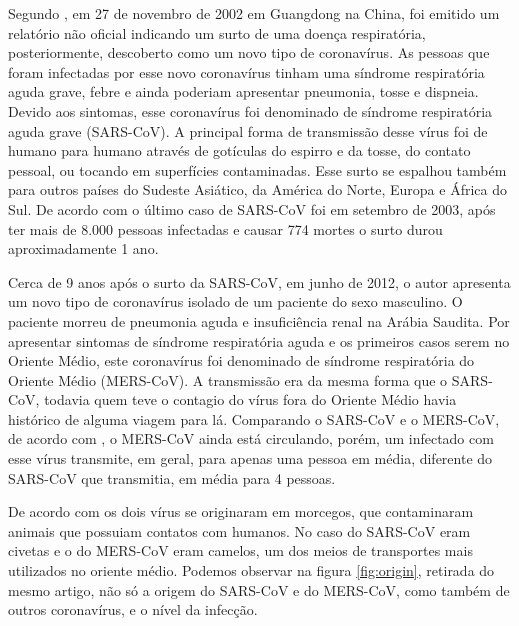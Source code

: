 \documentclass[
  fleqn,ebook]{ic}
\begin{document}
Segundo \cite{al2014travel}, em 27 de novembro de 2002 em Guangdong na
China, foi emitido um relatório não oficial indicando um surto de uma doença
respiratória, posteriormente, descoberto como um novo tipo de coronavírus.
As pessoas que foram infectadas por esse novo coronavírus tinham uma síndrome
respiratória aguda grave, febre e ainda poderiam apresentar pneumonia, tosse e
dispneia. Devido aos sintomas, esse coronavírus foi denominado de síndrome
respiratória aguda grave (SARS-CoV). A principal forma de transmissão desse
vírus foi de humano para humano através de gotículas do espirro e da tosse, do
contato pessoal, ou tocando em superfícies contaminadas. Esse surto se espalhou
também para outros países do Sudeste Asiático, da América do Norte, Europa e
África do Sul. De acordo com \citep{guarner2020three} o último caso de SARS-CoV foi
em setembro de 2003, após ter mais de 8.000 pessoas infectadas e causar 774
mortes o surto durou aproximadamente 1 ano.

Cerca de 9 anos após o surto da SARS-CoV, em junho de 2012, o autor
\cite{@song2019sars} apresenta um novo tipo de coronavírus isolado de um
paciente do sexo masculino. O paciente morreu de pneumonia aguda e insuficiência
renal na Arábia Saudita. Por apresentar sintomas de síndrome respiratória aguda
e os primeiros casos serem no Oriente Médio, este coronavírus foi denominado de
síndrome respiratória do Oriente Médio (MERS-CoV). A transmissão era da mesma
forma que o SARS-CoV, todavia quem teve o contagio do vírus fora do
Oriente Médio havia histórico de alguma viagem para lá. Comparando o SARS-CoV e
o MERS-CoV, de acordo com \cite{guarner2020three}, o MERS-CoV ainda está
circulando, porém, um infectado com esse vírus transmite, em geral, para apenas
uma pessoa em média, diferente do SARS-CoV que transmitia, em média para 4
pessoas.

De acordo com \cite{cui2019origin} os dois vírus se originaram em morcegos,
que contaminaram animais que possuiam contatos com humanos. No caso do SARS-CoV
eram civetas e o do MERS-CoV eram camelos, um dos meios de transportes mais
utilizados no oriente médio. Podemos observar na figura \ref{fig:origin}, retirada
do mesmo artigo, não só a origem do SARS-CoV e do MERS-CoV, como também de
outros coronavírus, e o nível da infecção.
\end{document}
